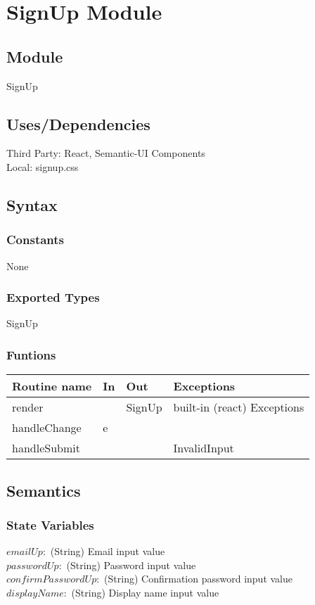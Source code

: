 \documentclass[12pt, titlepage]{article}
\begin{document}
\newpage

\section* {SignUp Module}

\subsection*{Module}

SignUp

\subsection* {Uses/Dependencies}
Third Party: React, Semantic-UI Components\\
Local: signup.css

\subsection* {Syntax}

\subsubsection* {Constants} None
\subsubsection* {Exported Types} SignUp
\subsubsection* {Funtions}
\begin{tabular}{| l | l | l | l |}
\hline
\textbf{Routine name} & \textbf{In} & \textbf{Out} & \textbf{Exceptions}\\
\hline
render & ~ & SignUp & built-in (react) Exceptions\\
\hline
handleChange & e & ~ & ~\\
\hline
handleSubmit & ~ & ~ & InvalidInput\\
\hline
\end{tabular}
\subsection* {Semantics}

\subsubsection* {State Variables}
$emailUp: $ (String) Email input value\\
$passwordUp:$ (String) Password input value\\
$confirmPasswordUp:$ (String) Confirmation password input value\\
$displayName:$ (String) Display name input value\\
\end{document}
